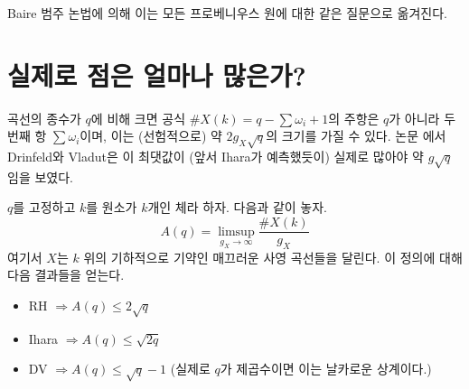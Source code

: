 \medskip\noindent
Baire 범주 논법에 의해 이는 모든 프로베니우스 원에 대한 같은 질문으로
옮겨진다.





\section{실제로 점은 얼마나 많은가?}
\label{section-really}

\noindent
곡선의 종수가 $q$에 비해 크면 공식
$\# X(k) = q - \sum \omega_i + 1$의 주항은 $q$가 아니라
두 번째 항 $\sum \omega_i$이며, 이는 (선험적으로)
약 $2g_X\sqrt{q}$의 크기를 가질 수 있다. 논문
\cite{Drinfeld-number}에서 Drinfeld와 Vladut은 이 최댓값이
(앞서 Ihara가 예측했듯이) 실제로 많아야 약 $g\sqrt{q}$임을 보였다.

\medskip\noindent
$q$를 고정하고 $k$를 원소가 $k$개인 체라 하자.
다음과 같이 놓자.
$$
A(q) = \limsup_{g_X \to \infty} \frac{\# X(k)}{g_X}
$$
여기서 $X$는 $k$ 위의 기하적으로 기약인 매끄러운 사영 곡선들을
달린다. 이 정의에 대해 다음 결과들을 얻는다.
\begin{itemize}
\item RH $\Rightarrow A(q)\leq 2\sqrt{q}$
\item Ihara $\Rightarrow A(q)\leq \sqrt{2q}$
\item DV $\Rightarrow A(q)\leq \sqrt{q}-1$ (실제로 $q$가 제곱수이면
이는 날카로운 상계이다.)
\end{itemize}

